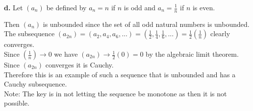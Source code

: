\documentclass{article}
\begin{document}
{\Large \textbf{d.}} Let $(a_n)$ be defined by $a_n = n$ if $n$ is odd and $a_n =\frac{1}{n}$ if $n$ is even.
\begin{center}
    \doublespacing
    Then $(a_n)$ is unbounded since the set of all odd natural numbers is unbounded.
    \\The subsequence $(a_{2n}) = (a_2, a_4, a_6, ...) = (\frac{1}{2},\frac{1}{4},\frac{1}{6}, ...) = \frac{1}{2} (\frac{1}{n})$ clearly converges.
    \\Since $(\frac{1}{n})\rightarrow 0$ we have $(a_{2n})\rightarrow \frac{1}{2} (0) = 0$ by the algebraic limit theorem.
    \\Since $(a_{2n})$ converges it is Cauchy.
    \\Therefore this is an example of such a sequence that is unbounded and has a Cauchy subsequence.
    \\Note: The key is in not letting the sequence be monotone as then it is not possible.
\end{center}


\newpage
\end{document}
